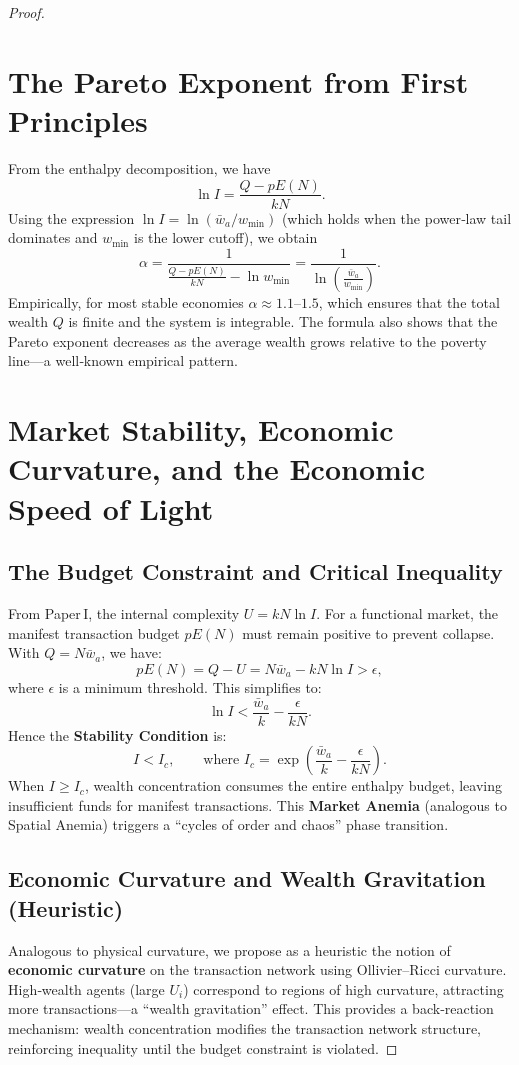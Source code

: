 \documentclass{article}
\begin{document}
\begin{proof}
\section{The Pareto Exponent from First Principles}
From the enthalpy decomposition, we have
\[
\ln I = \frac{Q - pE(N)}{kN}.
\]
Using the expression $\ln I = \ln(\bar{w}_a / w_{\min})$ (which holds when the power‑law tail dominates and $w_{\min}$ is the lower cutoff), we obtain
\[
\alpha = \frac{1}{\frac{Q - pE(N)}{kN} - \ln w_{\min}} = \frac{1}{\ln\left( \frac{\bar{w}_a}{w_{\min}} \right)}.
\]
Empirically, for most stable economies $\alpha \approx 1.1$–$1.5$, which ensures that the total wealth $Q$ is finite and the system is integrable. The formula also shows that the Pareto exponent decreases as the average wealth grows relative to the poverty line—a well‑known empirical pattern.

\section{Market Stability, Economic Curvature, and the Economic Speed of Light}
\subsection{The Budget Constraint and Critical Inequality}
From Paper I, the internal complexity $U = k N \ln I$. For a functional market, the manifest transaction budget $pE(N)$ must remain positive to prevent collapse. With $Q = N\bar{w}_a$, we have:
\[
pE(N) = Q - U = N\bar{w}_a - k N \ln I > \epsilon,
\]
where $\epsilon$ is a minimum threshold. This simplifies to:
\[
\ln I < \frac{\bar{w}_a}{k} - \frac{\epsilon}{kN}.
\]
Hence the \textbf{Stability Condition} is:
\[
I < I_c, \qquad \text{where } I_c = \exp\left( \frac{\bar{w}_a}{k} - \frac{\epsilon}{kN} \right).
\]
When $I \ge I_c$, wealth concentration consumes the entire enthalpy budget, leaving insufficient funds for manifest transactions. This \textbf{Market Anemia} (analogous to Spatial Anemia) triggers a “cycles of order and chaos” phase transition.

\subsection{Economic Curvature and Wealth Gravitation (Heuristic)}
Analogous to physical curvature, we propose as a heuristic the notion of \textbf{economic curvature} on the transaction network using Ollivier–Ricci curvature. High‑wealth agents (large $U_i$) correspond to regions of high curvature, attracting more transactions—a “wealth gravitation” effect. This provides a back‑reaction mechanism: wealth concentration modifies the transaction network structure, reinforcing inequality until the budget constraint is violated.


\end{proof}
\end{document}
